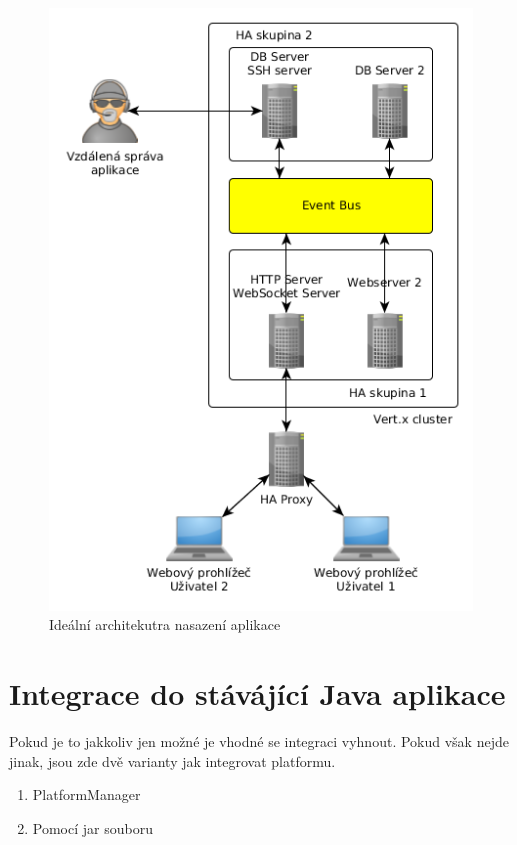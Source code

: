 \begin{figure}
\begin{centering}
\includegraphics[scale=0.5]{obrazky/architecture_ideal}
\par\end{centering}
\caption{Ideální architekutra nasazení aplikace\label{fig:architecture_ideal}}
\end{figure}

\section{Integrace do stávájící Java aplikace}

Pokud je to jakkoliv jen možné je vhodné se integraci vyhnout. Pokud však nejde jinak, jsou zde dvě varianty jak integrovat platformu.

\begin{enumerate}
\item PlatformManager
\item Pomocí jar souboru
\end{enumerate}

